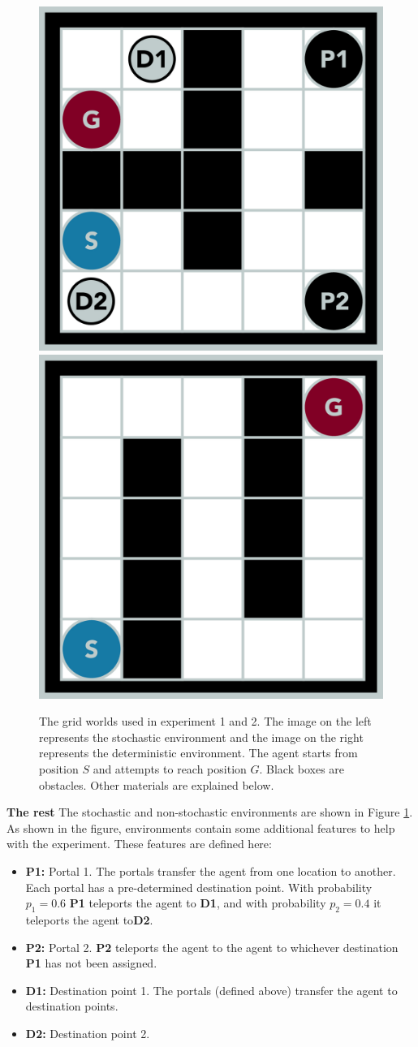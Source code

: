 \documentclass[10pt, letterpaper, twocolumn]{article}
\begin{document}
	\begin{figure}[h]
		\centering
		\includegraphics[width=0.49\linewidth]{grid_2x2}
		\includegraphics[width=0.49\linewidth]{grid_2x2_det}		
		\caption{\small The grid worlds used in experiment 1 and 2. The image on the left represents the stochastic environment and the image on the right represents the deterministic environment. The agent starts from position $S$ and attempts to reach position $G$. Black boxes are obstacles. Other materials are explained below.}
		\label{fig:grid_world}
	\end{figure}
	
	\noindent \textbf{The rest} The stochastic and non-stochastic environments are shown in Figure \ref{fig:grid_world}. As shown in the figure, environments contain some additional features to help with the experiment. These features are defined here:
	\begin{itemize}
		\item \textbf{P1:} Portal 1. The portals transfer the agent from one location to another. Each portal has a pre-determined destination point. With probability $p_1 = 0.6$ \textbf{P1} teleports the agent to \textbf{D1}, and with probability $p_2 = 0.4$ it teleports the agent to\textbf{D2}.
		\item \textbf{P2:} Portal 2. \textbf{P2} teleports the agent to the agent to whichever destination \textbf{P1} has not been assigned. 
		\item \textbf{D1:} Destination point 1. The portals (defined above) transfer the agent to destination points.
		\item \textbf{D2:} Destination point 2. 
	\end{itemize}
	
\end{document}
